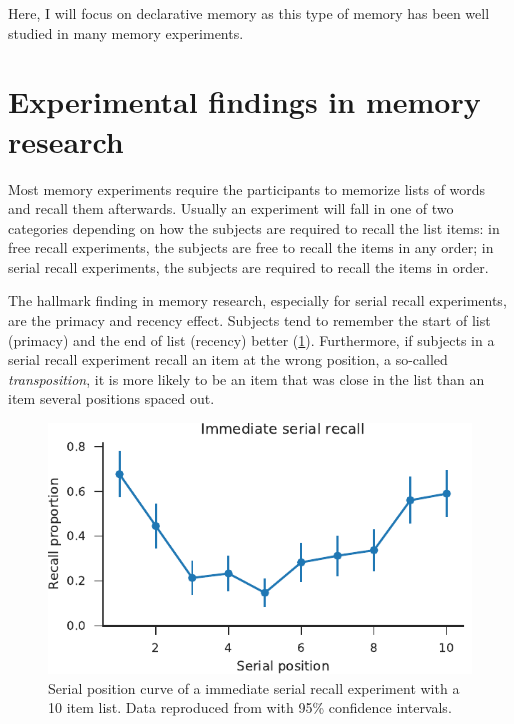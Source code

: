Here, I will focus on declarative memory as this type of memory has been well studied in many memory experiments.


\section{Experimental findings in memory research}\label{sec:exp-findings}
Most memory experiments require the participants to memorize lists of words and recall them afterwards.
Usually an experiment will fall in one of two categories depending on how the subjects are required to recall the list items: in free recall experiments, the subjects are free to recall the items in any order; in serial recall experiments, the subjects are required to recall the items in order.

The hallmark finding in memory research, especially for serial recall experiments, are the primacy and recency effect.
Subjects tend to remember the start of list (primacy) and the end of list (recency) better (\cref{fig:exp-serial-pos}).
Furthermore, if subjects in a serial recall experiment recall an item at the wrong position, a so-called \emph{transposition}, it is more likely to be an item that was close in the list than an item several positions spaced out.
\begin{figure}
    \centering
    \includegraphics{figures/exp-serial-pos}
    \caption[Immediate serial recall position curve]{Serial position curve of a immediate serial recall experiment with a 10 item list. Data reproduced from \textcite{Jahnke1968} with 95\% confidence intervals.}\label{fig:exp-serial-pos}
\end{figure}

